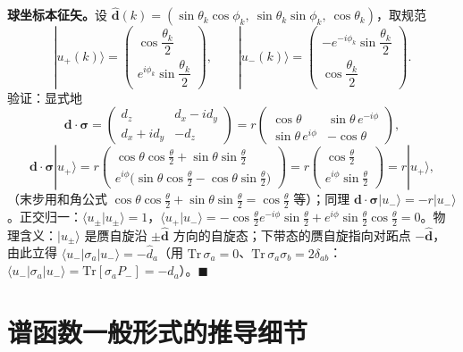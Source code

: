 \documentclass[onecolumn,aps,prl,superscriptaddress,longbibliography]{revtex4-2}
\begin{document}
\textbf{球坐标本征矢。}设 $\hat{\mathbf{d}}(k) = (\sin\theta_k\cos\phi_k,\ \sin\theta_k\sin\phi_k,\ \cos\theta_k)$，取规范
\begin{equation}\label{eq:eigenstates}
|u_+(k)\rangle = \begin{pmatrix} \cos\dfrac{\theta_k}{2} \\[6pt] e^{i\phi_k}\sin\dfrac{\theta_k}{2} \end{pmatrix},\qquad
|u_-(k)\rangle = \begin{pmatrix} -e^{-i\phi_k}\sin\dfrac{\theta_k}{2} \\[6pt] \cos\dfrac{\theta_k}{2} \end{pmatrix}.
\end{equation}
验证：显式地
$$\mathbf{d}\cdot\symbf{\sigma} = \begin{pmatrix} d_z & d_x - id_y \\ d_x + id_y & -d_z \end{pmatrix} = r\begin{pmatrix} \cos\theta & \sin\theta\,e^{-i\phi} \\ \sin\theta\,e^{i\phi} & -\cos\theta \end{pmatrix},$$
$$\mathbf{d}\cdot\symbf{\sigma}|u_+\rangle = r\begin{pmatrix} \cos\theta\cos\frac{\theta}{2} + \sin\theta\sin\frac{\theta}{2} \\ e^{i\phi}\big(\sin\theta\cos\frac{\theta}{2} - \cos\theta\sin\frac{\theta}{2}\big) \end{pmatrix} = r\begin{pmatrix} \cos\frac{\theta}{2} \\ e^{i\phi}\sin\frac{\theta}{2} \end{pmatrix} = r|u_+\rangle,$$
（末步用和角公式 $\cos\theta\cos\frac{\theta}{2} + \sin\theta\sin\frac{\theta}{2} = \cos\frac{\theta}{2}$ 等）；同理 $\mathbf{d}\cdot\symbf{\sigma}|u_-\rangle = -r|u_-\rangle$。正交归一：$\langle u_\pm|u_\pm\rangle = 1$，$\langle u_+|u_-\rangle = -\cos\frac{\theta}{2}e^{-i\phi}\sin\frac{\theta}{2} + e^{i\phi}\sin\frac{\theta}{2}\cos\frac{\theta}{2} = 0$。物理含义：$|u_\pm\rangle$ 是赝自旋沿 $\pm\hat{\mathbf{d}}$ 方向的自旋态；下带态的赝自旋指向对跖点 $-\hat{\mathbf{d}}$，由此立得 $\langle u_-|\sigma_a|u_-\rangle = -\hat d_a$（用 $\mathrm{Tr}\,\sigma_a = 0$、$\mathrm{Tr}\,\sigma_a\sigma_b = 2\delta_{ab}$：$\langle u_-|\sigma_a|u_-\rangle = \mathrm{Tr}[\sigma_aP_-] = -\hat d_a$）。$\blacksquare$

\section{谱函数一般形式的推导细节}\label{app:spsf_detail}
\end{document}
